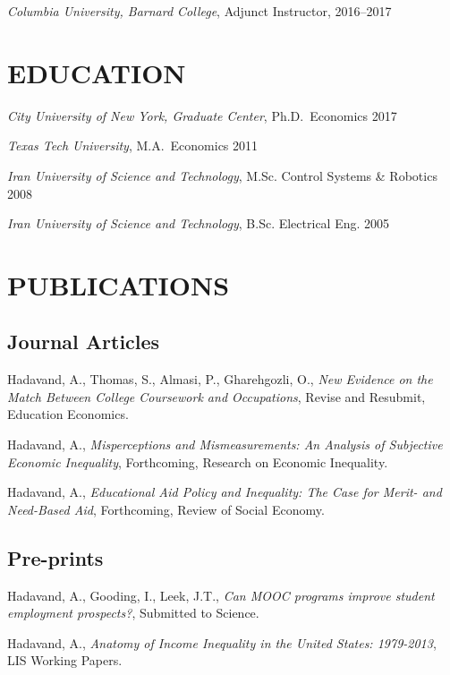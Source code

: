 \documentclass[10pt,]{article}
\begin{document}
\emph{Columbia University, Barnard College}, Adjunct Instructor,
\hfill 2016--2017

\hypertarget{education}{%
\section{EDUCATION}\label{education}}

\emph{City University of New York, Graduate Center}, Ph.D.~Economics
\hfill 2017

\emph{Texas Tech University}, M.A.~Economics \hfill 2011

\emph{Iran University of Science and Technology}, M.Sc. Control Systems
\& Robotics \hfill 2008

\emph{Iran University of Science and Technology}, B.Sc. Electrical Eng.
\hfill 2005

\hypertarget{publications}{%
\section{PUBLICATIONS}\label{publications}}

\hypertarget{journal-articles}{%
\subsection{\texorpdfstring{\textbf{Journal
Articles}}{Journal Articles}}\label{journal-articles}}

Hadavand, A., Thomas, S., Almasi, P., Gharehgozli, O., \emph{New
Evidence on the Match Between College Coursework and Occupations},
Revise and Resubmit, Education Economics.

Hadavand, A., \emph{Misperceptions and Mismeasurements: An Analysis of
Subjective Economic Inequality}, Forthcoming, Research on Economic
Inequality.

Hadavand, A., \emph{Educational Aid Policy and Inequality: The Case for
Merit- and Need-Based Aid}, Forthcoming, Review of Social Economy.

\hypertarget{pre-prints}{%
\subsection{\texorpdfstring{\textbf{Pre-prints}}{Pre-prints}}\label{pre-prints}}

Hadavand, A., Gooding, I., Leek, J.T., \emph{Can MOOC programs improve
student employment prospects?}, Submitted to Science.

Hadavand, A., \emph{Anatomy of Income Inequality in the United States:
1979-2013}, LIS Working Papers.
\end{document}
